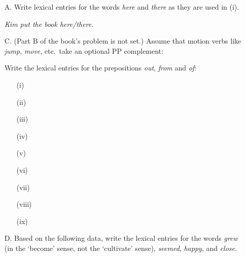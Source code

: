 \documentclass[a4paper,landscape,headrule,footrule]{foils}
\begin{document}
\begin{itemize}

\item[A.] Write lexical entries for the words {\it here} and {\it there} as
they are used in (i).

   \begin{exe}
   \it Kim put the book here/there.
   \end{exe}

\newpage


\item[C.] (Part B of the book's problem is not set.)
Assume that motion verbs like {\it jump}, {\it move}, etc.\
take an optional PP complement:

\begin{quote}
\avm{[ COMPS & < (PP) > ]}
\end{quote}
%
Write
the lexical entries for the
prepositions {\it out}, {\it from} and {\it of}:

   \begin{itemize}
   \item[(i)] 
   \item[(ii)] 
   \item[(iii)] 
   \item[(iv)] 
   \item[(v)] 
   \item[(vi)] 
   \item[(vii)] 
   \item[(viii)] 
   \item[(ix)] 
   \end{itemize}
\newpage
\item[D.] Based on the following data, 
write 
the  lexical entries for
the words {\it grew} (in the `become' sense, not the `cultivate'
sense), {\it seemed}, {\it happy}, and {\it close}. 


\end{itemize}
\end{document}
